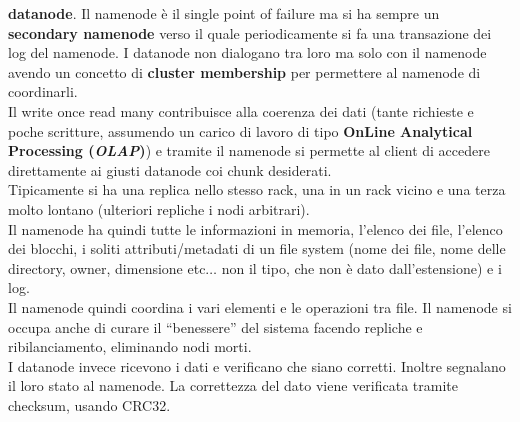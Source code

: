 \documentclass[a4paper,12pt, oneside]{book}
\begin{document}
\textbf{datanode}. Il namenode è il single point of failure ma si ha sempre un
\textbf{secondary namenode} verso il quale periodicamente si fa una transazione
dei log del namenode. I datanode non dialogano tra loro ma solo con il namenode
avendo un concetto di \textbf{cluster membership} per permettere al namenode di
coordinarli.  \\
Il write once read many contribuisce alla coerenza dei dati (tante richieste e
poche scritture, assumendo un carico di lavoro di tipo
\textbf{OnLine Analytical Processing (\textit{OLAP})}) e tramite il 
namenode si permette al client di accedere direttamente ai giusti datanode coi
chunk desiderati. \\
Tipicamente si ha una replica nello stesso rack, una in un rack vicino e una
terza molto lontano (ulteriori repliche i nodi arbitrari).  \\
Il namenode ha quindi tutte le informazioni in memoria, l'elenco dei file,
l'elenco dei blocchi, i soliti attributi/metadati di un file system (nome dei
file, nome 
delle directory, owner, dimensione etc$\ldots$ non il tipo, che non è dato
dall'estensione) e i log.\\ 
Il namenode quindi coordina i vari elementi e le operazioni tra file. Il
namenode si occupa anche di curare il ``benessere'' del sistema facendo repliche
e ribilanciamento, eliminando nodi morti.\\
I datanode invece ricevono i dati e verificano che siano corretti. Inoltre
segnalano il loro stato al namenode. La correttezza del dato viene verificata
tramite checksum, usando CRC32.
\end{document}
